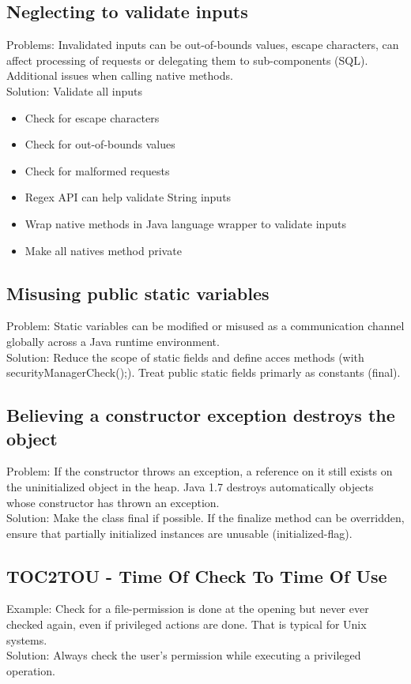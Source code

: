 \documentclass[10pt]{article}
\begin{document}
\subsection{Neglecting to validate inputs}
Problems: Invalidated inputs can be out-of-bounds values, escape characters, can affect processing of requests or delegating them to sub-components (SQL). Additional issues when calling native methods.\\
Solution: Validate all inputs
\begin{itemize}
	\item Check for escape characters
	\item Check for out-of-bounds values
	\item Check for malformed requests
	\item Regex API can help validate String inputs
	\item Wrap native methods in Java language wrapper to validate inputs
	\item Make all natives method private
\end{itemize}
\subsection{Misusing public static variables}
Problem: Static variables can be modified or misused as a communication channel globally across a Java runtime environment.\\
Solution: Reduce the scope of static fields and define acces methods (with securityManagerCheck();). Treat public static fields primarly as constants (final).

\subsection{Believing a constructor exception destroys the object}
Problem: If the constructor throws an exception, a reference on it still exists on the uninitialized object in the heap. Java 1.7 destroys automatically objects whose constructor has thrown an exception.\\
Solution: Make the class final if possible. If the finalize method can be overridden, ensure that partially initialized instances are unusable (initialized-flag).
\subsection{TOC2TOU - Time Of Check To Time Of Use}
Example: Check for a file-permission is done at the opening but never ever checked again, even if privileged actions are done. That is typical for Unix systems.\\
Solution: Always check the user's permission while executing a privileged operation.
\end{document}
